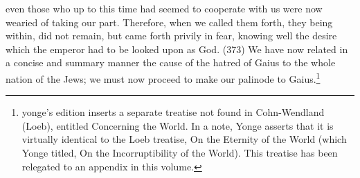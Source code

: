 even those who up to this time had seemed to cooperate with us were now wearied of taking our
part. Therefore, when we called them forth, they being within, did not remain, but came forth privily
in fear, knowing well the desire which the emperor had to be looked upon as God. (373) We have
now related in a concise and summary manner the cause of the hatred of Gaius to the whole
nation of the Jews; we must now proceed to make our palinode to Gaius.\footnote{yonge's edition inserts a
separate treatise not found in Cohn-Wendland (Loeb), entitled Concerning the World. In a note, Yonge asserts that it is
virtually identical to the Loeb treatise, On the Eternity of the World (which Yonge titled, On the Incorruptibility of the
World). This treatise has been relegated to an appendix in this volume.}
